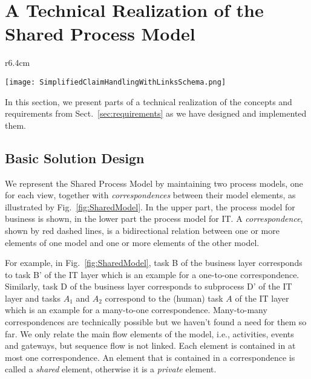 \section{A Technical Realization of the Shared Process Model}
\label{sec:realization}

\begin{wrapfigure}{r}{6.4cm} %
{\small
\centering
\vspace{-0.7cm}
\texttt{[image: SimplifiedClaimHandlingWithLinksSchema.png]} %
\caption{ The Shared Process Model as a combination of two individual models, coupled by correspondences \label{fig:SharedModel}}}
\vspace{-1.5cm}
\end{wrapfigure}
In this section, we present parts of a technical realization of the concepts and requirements from Sect.~\ref{sec:requirements} as we have designed and implemented them.
%
\subsection{Basic Solution Design}


We represent the Shared Process Model by maintaining two process models, one for each view, together with
\emph{correspondences} between their model elements, as illustrated by Fig.~\ref{fig:SharedModel}. In the upper part, the process model for business is shown, in the lower part the process model for IT.
A \emph{correspondence}, shown by red dashed lines, is a bidirectional relation between one or more elements of one model and one or more elements of the other model.

For example, in Fig.~\ref{fig:SharedModel}, task B of the business layer corresponds to task B' of the IT layer which is an example for a one-to-one correspondence. Similarly, task D of the business layer corresponds to subprocess D' of the IT layer and tasks $A_1$ and $A_2$ correspond to the (human) task $A$ of the IT layer which is an example for a many-to-one correspondence. Many-to-many correspondences are technically possible but we haven't found a need for them so far. We only relate the main flow elements of the model, i.e., activities, events and gateways, but sequence flow is not linked. Each element is contained in at most one correspondence. An element that is contained in a correspondence is called a \emph{shared} element, otherwise it is a \emph{private} element.

